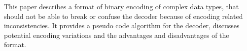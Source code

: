 This paper describes a format of binary encoding of complex data types,
that should not be able to
break or confuse the decoder because of encoding related inconsistencies.
It provides a pseudo code algorithm for the decoder,
discusses potential encoding variations and the advantages
and disadvantages of the format.
